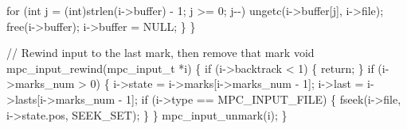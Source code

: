 \documentclass[
  a4paper,
]{scrreprt}
\newenvironment{Shaded}{\begin{snugshade}}{\end{snugshade}}
\newcommand{\CommentTok}[1]{\textcolor[rgb]{0.41,0.41,0.41}{#1}}
\newcommand{\ControlFlowTok}[1]{\textcolor[rgb]{0.85,0.12,0.09}{#1}}
\newcommand{\DataTypeTok}[1]{\textcolor[rgb]{0.47,0.16,0.63}{#1}}
\newcommand{\DecValTok}[1]{\textcolor[rgb]{0.47,0.16,0.63}{#1}}
\newcommand{\NormalTok}[1]{\textcolor[rgb]{0.33,0.33,0.33}{#1}}
\newcommand{\OperatorTok}[1]{\textcolor[rgb]{0.00,0.46,0.62}{#1}}
\theoremstyle{definition}
\theoremstyle{remark}
\begin{document}
\begin{Shaded}
\begin{Highlighting}[numbers=left,,]
    \ControlFlowTok{for} \OperatorTok{(}\DataTypeTok{int}\NormalTok{ j }\OperatorTok{=} \OperatorTok{(}\DataTypeTok{int}\OperatorTok{)}\NormalTok{strlen}\OperatorTok{(}\NormalTok{i}\OperatorTok{{-}\textgreater{}}\NormalTok{buffer}\OperatorTok{)} \OperatorTok{{-}} \DecValTok{1}\OperatorTok{;}\NormalTok{ j }\OperatorTok{\textgreater{}=} \DecValTok{0}\OperatorTok{;}\NormalTok{ j}\OperatorTok{{-}{-})}
\NormalTok{      ungetc}\OperatorTok{(}\NormalTok{i}\OperatorTok{{-}\textgreater{}}\NormalTok{buffer}\OperatorTok{[}\NormalTok{j}\OperatorTok{],}\NormalTok{ i}\OperatorTok{{-}\textgreater{}}\NormalTok{file}\OperatorTok{);}
\NormalTok{    free}\OperatorTok{(}\NormalTok{i}\OperatorTok{{-}\textgreater{}}\NormalTok{buffer}\OperatorTok{);}
\NormalTok{    i}\OperatorTok{{-}\textgreater{}}\NormalTok{buffer }\OperatorTok{=}\NormalTok{ NULL}\OperatorTok{;}
  \OperatorTok{\}}
\OperatorTok{\}}

\CommentTok{// Rewind input to the last mark, then remove that mark}
\DataTypeTok{void}\NormalTok{ mpc\_input\_rewind}\OperatorTok{(}\NormalTok{mpc\_input\_t }\OperatorTok{*}\NormalTok{i}\OperatorTok{)} \OperatorTok{\{}
  \ControlFlowTok{if} \OperatorTok{(}\NormalTok{i}\OperatorTok{{-}\textgreater{}}\NormalTok{backtrack }\OperatorTok{\textless{}} \DecValTok{1}\OperatorTok{)} \OperatorTok{\{} \ControlFlowTok{return}\OperatorTok{;} \OperatorTok{\}}
  \ControlFlowTok{if} \OperatorTok{(}\NormalTok{i}\OperatorTok{{-}\textgreater{}}\NormalTok{marks\_num }\OperatorTok{\textgreater{}} \DecValTok{0}\OperatorTok{)} \OperatorTok{\{}
\NormalTok{    i}\OperatorTok{{-}\textgreater{}}\NormalTok{state }\OperatorTok{=}\NormalTok{ i}\OperatorTok{{-}\textgreater{}}\NormalTok{marks}\OperatorTok{[}\NormalTok{i}\OperatorTok{{-}\textgreater{}}\NormalTok{marks\_num }\OperatorTok{{-}} \DecValTok{1}\OperatorTok{];}
\NormalTok{    i}\OperatorTok{{-}\textgreater{}}\NormalTok{last }\OperatorTok{=}\NormalTok{ i}\OperatorTok{{-}\textgreater{}}\NormalTok{lasts}\OperatorTok{[}\NormalTok{i}\OperatorTok{{-}\textgreater{}}\NormalTok{marks\_num }\OperatorTok{{-}} \DecValTok{1}\OperatorTok{];}
    \ControlFlowTok{if} \OperatorTok{(}\NormalTok{i}\OperatorTok{{-}\textgreater{}}\NormalTok{type }\OperatorTok{==}\NormalTok{ MPC\_INPUT\_FILE}\OperatorTok{)} \OperatorTok{\{}
\NormalTok{      fseek}\OperatorTok{(}\NormalTok{i}\OperatorTok{{-}\textgreater{}}\NormalTok{file}\OperatorTok{,}\NormalTok{ i}\OperatorTok{{-}\textgreater{}}\NormalTok{state}\OperatorTok{.}\NormalTok{pos}\OperatorTok{,}\NormalTok{ SEEK\_SET}\OperatorTok{);}
    \OperatorTok{\}}
  \OperatorTok{\}}
\NormalTok{  mpc\_input\_unmark}\OperatorTok{(}\NormalTok{i}\OperatorTok{);}
\OperatorTok{\}}


\end{Highlighting}
\end{Shaded}
\end{document}
